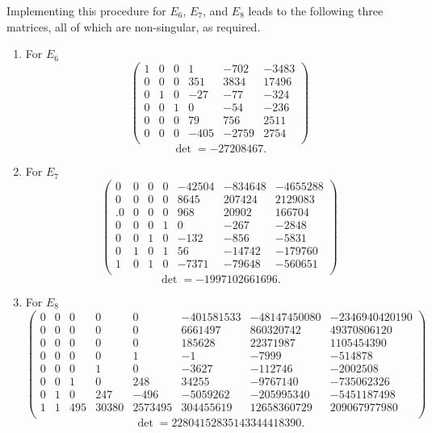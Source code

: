\documentclass[twoside,a4paper,reqno,11pt]{amsart}
\begin{document}
Implementing this procedure for $E_6$, $E_7$, and $E_8$ leads to the following three matrices, all of which are non-singular, as required.
\begin{enumerate}
\item
For $E_6$
$$
\begin{pmatrix}
1&    0&     0&    1& -702&-3483\\
0&    0&    0&  351& 3834&17496\\
0&    1&    0&  -27&  -77& -324\\
0&    0&    1&    0&  -54& -236\\
0&    0&    0&   79&  756& 2511\\
0&    0&    0& -405&-2759& 2754\\
\end{pmatrix}
$$
$$
\det =  -27208467.
$$
\item
For $E_7$
$$
\begin{pmatrix} 
0&   0&   0&   0&  -42504& -834648&-4655288\\
0&   0&   0&   0&8645&  207424& 2129083\\.
0&   0&   0&   0& 968&   20902&  166704\\
0&   0&   0&   1&   0&-267&   -2848\\
0&   0&   1&   0&-132&-856&   -5831\\
0&   1&   0&   1&  56&  -14742& -179760\\
1&   0&   1&   0&   -7371&  -79648& -560651\\
\end{pmatrix} 
$$
$$
\det =  -1997102661696.
$$
\item
For $E_8$
$$ 
\begin{pmatrix}   
0& 0& 0& 0& 0&-401581533&  -48147450080&-2346940420190\\
0& 0& 0& 0& 0&   6661497& 860320742&   49370806120\\
0& 0& 0& 0& 0&185628&  22371987&1105454390\\
0& 0& 0& 0& 1&-1& -7999&   -514878\\
0& 0& 0& 1& 0& -3627&   -112746&  -2002508\\  
0& 0& 1& 0&   248& 34255&  -9767140&-735062326\\  
0& 1& 0&   247&  -496&  -5059262&-205995340&   -5451187498\\  
1& 1&   495& 30380&   2573495& 304455619&   12658360729&  209067977980\\
\end{pmatrix} 
$$
$$
\det = 22804152835143344418390.
$$
\end{enumerate}
\end{document}
